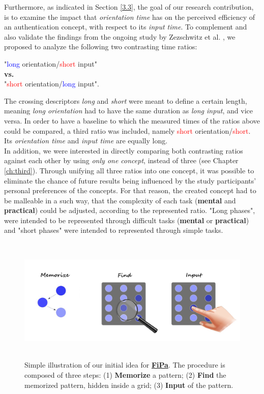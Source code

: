 Furthermore, as indicated in Section \ref{3.3}, the goal of our research contribution, is to examine the impact that \textit{orientation time} has on the perceived efficiency of an authentication concept, with respect to its \textit{input time}. To complement and also validate the findings from the ongoing study by Zezschwitz et al. \cite{Zezschwitz}, we proposed to analyze the following two contrasting time ratios:  
\begin{center}
    "\textcolor{blue}{long} orientation/\textcolor{red}{short} input" \\
    \textbf{vs.} \\
    "\textcolor{red}{short} orientation/\textcolor{blue}{long} input".
\end{center} 

The crossing descriptors \textit{long} and \textit{short} were meant to define a certain length, meaning \textit{long orientation} had to have the same duration as \textit{long input}, and vice versa. In order to have a baseline to which the measured times of the ratios above could be compared, a third ratio was included, namely \textcolor{red}{short} orientation/\textcolor{red}{short}. Its \textit{orientation time} and \textit{input time} are equally long. \\
 

In addition, we were interested in directly comparing both contrasting ratios against each other by using \textit{only one concept}, instead of three (see Chapter \ref{ch:third}). Through unifying all three ratios into one concept, it was possible to eliminate the chance of future results being influenced by the study participants' personal preferences of the concepts.
For that reason, the created concept had to be malleable in a such way, that the complexity of each task (\textbf{mental} and \textbf{practical}) could be adjusted, according to the represented ratio. "Long phases", were intended to be represented through difficult tasks (\textbf{mental} or \textbf{practical}) and "short phases" were intended to represented through simple tasks.

\begin{figure}[t!]
\centering
\includegraphics[width=15cm, height=6cm]{Chapters/graphics/ConceptIdea.jpeg}
\caption{Simple illustration of our initial idea for \underline{\textbf{FiPa}}. The procedure is composed of three steps: (1) \textbf{Memorize} a pattern; (2) \textbf{Find} the memorized pattern, hidden inside a grid; (3) \textbf{Input} of the pattern.}
\label{fig:concept}
\end{figure}

